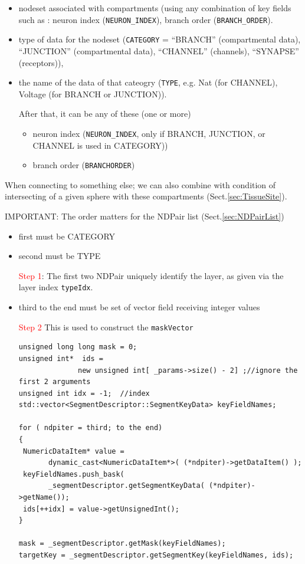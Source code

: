 \begin{itemize}
  \item nodeset associated with compartments (using any combination
  of key fields such as : neuron index (\verb!NEURON_INDEX!), branch
  order (\verb!BRANCH_ORDER!).
  
  \item   
type of data  for the nodeset (\verb!CATEGORY! = ``BRANCH'' (compartmental
data), ``JUNCTION'' (compartmental data), ``CHANNEL'' (channels), ``SYNAPSE''
(receptors)), 

 \item
the name of the data of that cateogry (\verb!TYPE!, e.g. Nat (for CHANNEL),
Voltage (for BRANCH or JUNCTION)).
  
  After that, it can be any of these (one or more)
  \begin{itemize}
    \item  neuron index (\verb!NEURON_INDEX!, only if BRANCH, JUNCTION, or
    CHANNEL is used in CATEGORY))
    
  
    \item branch order (\verb!BRANCHORDER!)
  \end{itemize}
  
\end{itemize}
When connecting to something else; we can also combine with condition of
intersecting of a given sphere with these compartments
(Sect.\ref{sec:TissueSite}).

IMPORTANT: The order matters for the NDPair list (Sect.\ref{sec:NDPairList})
\begin{itemize}
  \item first must be CATEGORY
  
  \item second must be TYPE

\textcolor{red}{Step 1}:
The first two NDPair uniquely identify the layer, as given via the
layer index \verb!typeIdx!.


  
  \item third to the end must be set of vector field receiving integer values
  
\textcolor{red}{Step 2}  
  This is used to construct the \verb!maskVector!
  
{\tiny
\begin{lstlisting}
unsigned long long mask = 0;
unsigned int*  ids =
              new unsigned int[ _params->size() - 2] ;//ignore the first 2 arguments
unsigned int idx = -1;  //index
std::vector<SegmentDescriptor::SegmentKeyData> keyFieldNames;

for ( ndpiter = third; to the end)
{
 NumericDataItem* value = 
       dynamic_cast<NumericDataItem*>( (*ndpiter)->getDataItem() );
 keyFieldNames.push_bask(
       _segmentDescriptor.getSegmentKeyData( (*ndpiter)->getName());
 ids[++idx] = value->getUnsignedInt();
}

mask = _segmentDescriptor.getMask(keyFieldNames);
targetKey = _segmentDescriptor.getSegmentKey(keyFieldNames, ids);
\end{lstlisting} 
}

\end{itemize}


